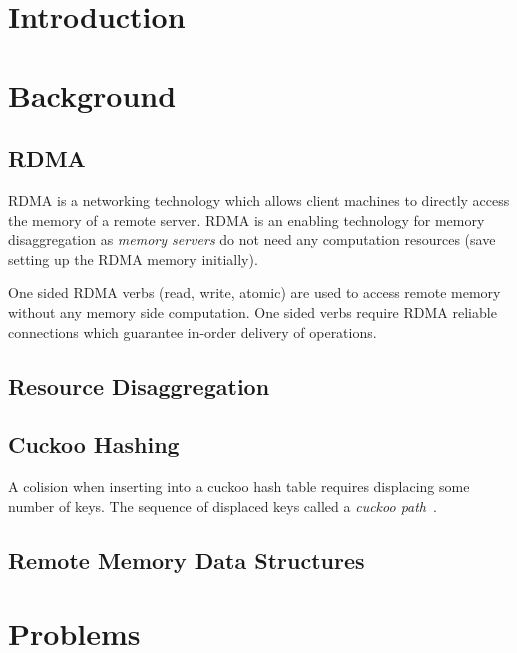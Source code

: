 \section{Introduction}
\label{sec:intro}


\section{Background}
\label{sec:background}

\subsection{RDMA}

RDMA is a networking technology which allows client machines
to directly access the memory of a remote server. RDMA is an
enabling technology for memory disaggregation as
\textit{memory servers} do not need any computation
resources (save setting up the RDMA memory initially).

One sided RDMA verbs (read, write, atomic) are used to
access remote memory without any memory side computation.
One sided verbs require RDMA reliable connections which
guarantee in-order delivery of operations.

\subsection{Resource Disaggregation}

\subsection{Cuckoo Hashing}

A colision when inserting into a cuckoo hash table requires
displacing some number of keys. The sequence of displaced
keys called a \textit{cuckoo
path}~\cite{cuckoo-improvements}.


\subsection{Remote Memory Data Structures}

\section{Problems}
\label{sec:problems}

